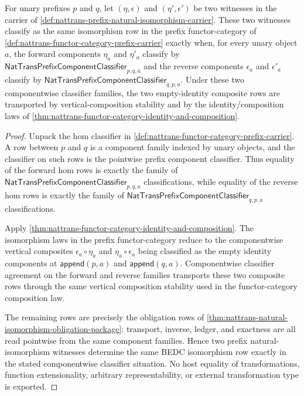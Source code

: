 \begin{theorem}
\label{thm:nattrans-functor-category-isomorphism-classifier-exactness}
For unary prefixes $p$ and $q$, let $(\eta,\epsilon)$ and
$(\eta',\epsilon')$ be two witnesses in the carrier of
\autoref{def:nattrans-prefix-natural-isomorphism-carrier}. These two witnesses
classify as the same isomorphism row in the prefix functor-category of
\autoref{def:nattrans-functor-category-prefix-carrier} exactly when, for every
unary object $a$, the forward components $\eta_a$ and $\eta'_a$ classify by
$\mathsf{NatTransPrefixComponentClassifier}_{p,q,a}$ and the reverse components
$\epsilon_a$ and $\epsilon'_a$ classify by
$\mathsf{NatTransPrefixComponentClassifier}_{q,p,a}$. Under these two
componentwise classifier families, the two empty-identity composite rows are
transported by vertical-composition stability and by the identity/composition
laws of \autoref{thm:nattrans-functor-category-identity-and-composition}.
\end{theorem}
\begin{proof}
Unpack the hom classifier in
\autoref{def:nattrans-functor-category-prefix-carrier}. A row between $p$ and
$q$ is a component family indexed by unary objects, and the classifier on such
rows is the pointwise prefix component classifier. Thus equality of the forward
hom rows is exactly the family of
$\mathsf{NatTransPrefixComponentClassifier}_{p,q,a}$ classifications, while
equality of the reverse hom rows is exactly the family of
$\mathsf{NatTransPrefixComponentClassifier}_{q,p,a}$ classifications.

Apply \autoref{thm:nattrans-functor-category-identity-and-composition}. The
isomorphism laws in the prefix functor-category reduce to the componentwise
vertical composites $\epsilon_a\circ\eta_a$ and $\eta_a\circ\epsilon_a$ being
classified as the empty identity components at $\mathsf{append}(p,a)$ and
$\mathsf{append}(q,a)$. Componentwise classifier agreement on the forward and
reverse families transports these two composite rows through the same vertical
composition stability used in the functor-category composition law.

The remaining rows are precisely the obligation rows of
\autoref{thm:nattrans-natural-isomorphism-obligation-package}: transport,
inverse, ledger, and exactness are all read pointwise from the same component
families. Hence two prefix natural-isomorphism witnesses determine the same
BEDC isomorphism row exactly in the stated componentwise classifier situation.
No host equality of transformations, function extensionality, arbitrary
representability, or external transformation type is exported.
\end{proof}

